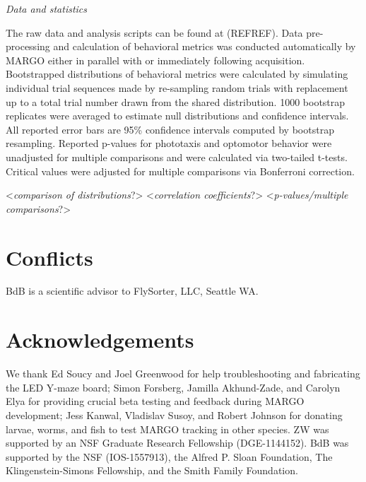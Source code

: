 \documentclass[10pt]{article}
\begin{document}
\begin{multicols}{2}
\vspace*{0.5cm}
\noindent\textit{Data and statistics}
\vspace*{0.3cm}

The raw data and analysis scripts can be found at (REFREF). Data pre-processing and calculation of behavioral metrics was conducted automatically by MARGO either in parallel with or immediately following acquisition. Bootstrapped distributions of behavioral metrics were calculated by simulating individual trial sequences made by re-sampling random trials with replacement up to a total trial number drawn from the shared distribution. 1000 bootstrap replicates were averaged to estimate null distributions and confidence intervals. All reported error bars are 95\% confidence intervals computed by bootstrap resampling. Reported p-values for phototaxis and optomotor behavior were unadjusted for multiple comparisons and were calculated via two-tailed t-tests. Critical values were adjusted for multiple comparisons via Bonferroni correction.

<\textit{comparison of distributions}?>
<\textit{correlation coefficients}?>
<\textit{p-values/multiple comparisons}?>

\section*{Conflicts}

BdB is a scientific advisor to FlySorter, LLC, Seattle WA.

\section*{Acknowledgements}

We thank Ed Soucy and Joel Greenwood for help troubleshooting and fabricating the LED Y-maze board; Simon Forsberg, Jamilla Akhund-Zade, and Carolyn Elya for providing crucial beta testing and feedback during MARGO development; Jess Kanwal, Vladislav Susoy, and Robert Johnson for donating larvae, worms, and fish to test MARGO tracking in other species. ZW was supported by an NSF Graduate Research Fellowship (DGE-1144152). BdB was supported by the NSF (IOS-1557913), the Alfred P. Sloan Foundation, The Klingenstein-Simons Fellowship, and the Smith Family Foundation. 

 
\end{multicols}
\end{document}
